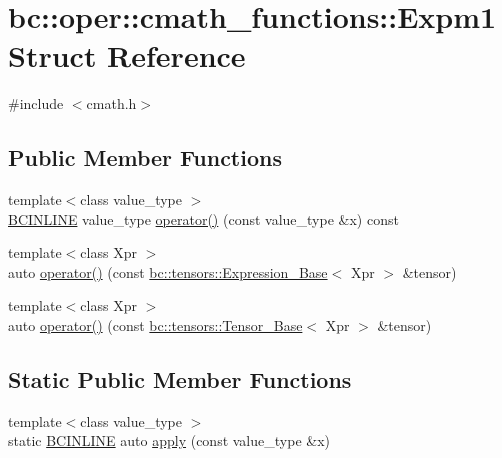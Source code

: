 \hypertarget{structbc_1_1oper_1_1cmath__functions_1_1Expm1}{}\section{bc\+:\+:oper\+:\+:cmath\+\_\+functions\+:\+:Expm1 Struct Reference}
\label{structbc_1_1oper_1_1cmath__functions_1_1Expm1}


{\ttfamily \#include $<$cmath.\+h$>$}

\subsection*{Public Member Functions}
\begin{DoxyCompactItemize}
\item 
{\footnotesize template$<$class value\+\_\+type $>$ }\\\hyperlink{common_8h_a6699e8b0449da5c0fafb878e59c1d4b1}{B\+C\+I\+N\+L\+I\+NE} value\+\_\+type \hyperlink{structbc_1_1oper_1_1cmath__functions_1_1Expm1_a5698a1a90d722073f67b59c5382a4c8f}{operator()} (const value\+\_\+type \&x) const
\item 
{\footnotesize template$<$class Xpr $>$ }\\auto \hyperlink{structbc_1_1oper_1_1cmath__functions_1_1Expm1_a49b235857c7d3620212b02066a98781b}{operator()} (const \hyperlink{classbc_1_1tensors_1_1Expression__Base}{bc\+::tensors\+::\+Expression\+\_\+\+Base}$<$ Xpr $>$ \&tensor)
\item 
{\footnotesize template$<$class Xpr $>$ }\\auto \hyperlink{structbc_1_1oper_1_1cmath__functions_1_1Expm1_ab32c22d765675d58c6291a6716231d41}{operator()} (const \hyperlink{classbc_1_1tensors_1_1Tensor__Base}{bc\+::tensors\+::\+Tensor\+\_\+\+Base}$<$ Xpr $>$ \&tensor)
\end{DoxyCompactItemize}
\subsection*{Static Public Member Functions}
\begin{DoxyCompactItemize}
\item 
{\footnotesize template$<$class value\+\_\+type $>$ }\\static \hyperlink{common_8h_a6699e8b0449da5c0fafb878e59c1d4b1}{B\+C\+I\+N\+L\+I\+NE} auto \hyperlink{structbc_1_1oper_1_1cmath__functions_1_1Expm1_a37bd32c7eb051fab0f756f02b1b5dcd4}{apply} (const value\+\_\+type \&x)
\end{DoxyCompactItemize}


